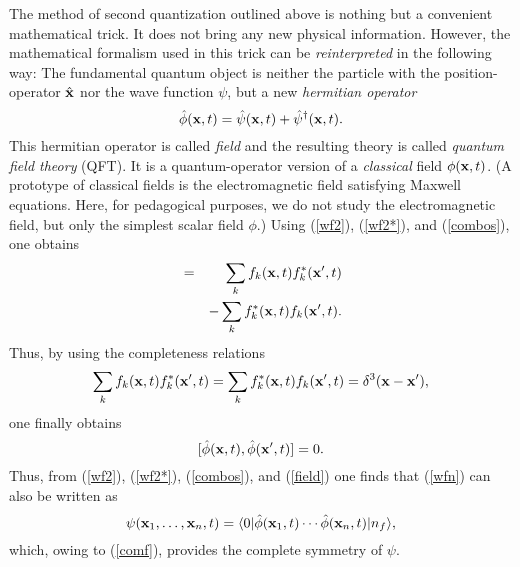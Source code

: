 \documentclass[12pt]{article}
\begin{document}
The method of second quantization outlined above 
is nothing but a convenient mathematical trick.
It does not bring any new physical information. However, 
the mathematical formalism used in this trick 
can be {\em reinterpreted} in the following way:
The fundamental quantum object is neither the particle 
with the position-operator $\hat{{\bf x}}$ nor the 
wave function $\psi$, but a new {\em hermitian operator}
\begin{equation}\label{field}
\hat{\phi}({\bf x},t) =
\hat{\psi}({\bf x},t) + \hat{\psi}^{\dagger}({\bf x},t) .
\end{equation}
This hermitian operator is called {\em field} and 
the resulting theory is called {\em quantum field theory} (QFT).
It is a quantum-operator version of a {\em classical} field 
$\phi({\bf x},t)$. 
(A prototype of classical fields 
is the electromagnetic field satisfying Maxwell equations.
Here, for pedagogical purposes, we do not study the 
electromagnetic field, but only the simplest scalar field $\phi$.) 
Using (\ref{wf2}), (\ref{wf2*}), and (\ref{combos}), one obtains
\begin{eqnarray}
[\hat{\phi}({\bf x},t),\hat{\phi}({\bf x}',t)] & = &
\sum_k f_k({\bf x},t) f_k^*({\bf x}',t) \nonumber \\
& & -\sum_k f_k^*({\bf x},t) f_k({\bf x}',t) .
\end{eqnarray}
Thus, by
using the completeness relations
\begin{equation}
\sum_k f_k({\bf x},t) f_k^*({\bf x}',t)=
\sum_k f_k^*({\bf x},t) f_k({\bf x}',t)=\delta^3({\bf x}-{\bf x}') ,
\end{equation}
one finally obtains
\begin{equation}\label{comf}
[\hat{\phi}({\bf x},t),\hat{\phi}({\bf x}',t)]=0.
\end{equation}
Thus, from (\ref{wf2}), (\ref{wf2*}), (\ref{combos}), and (\ref{field}) one 
finds that (\ref{wfn}) can also be written as
\begin{equation}\label{wfn2}
\psi({\bf x}_1,\ldots,{\bf x}_n, t)=
\langle 0|\hat{\phi}({\bf x}_1,t)\cdots\hat{\phi}({\bf x}_n,t)|n_f\rangle ,
\end{equation}
which, owing to (\ref{comf}), provides the complete symmetry
of $\psi$. 
\end{document}
